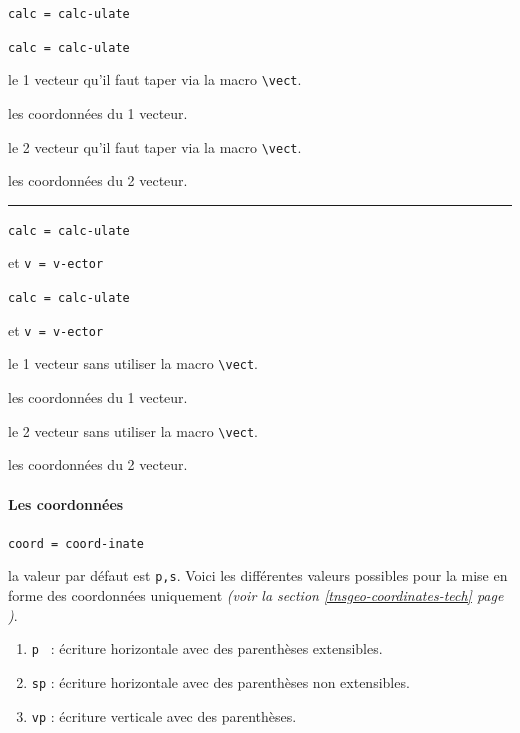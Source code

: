 \documentclass[12pt,a4paper]{book}
\newcommand\env[1]{\texttt{#1}}
\newcommand\macro[1]{\env{\textbackslash{}#1}}
\theoremstyle{definition}
\newcommand\separation{
	\medskip
	\hfill\rule{0.5\textwidth}{0.75pt}\hfill
	\medskip
}
\newcommand\mwhyprefix[2]{%
	\texttt{#1 = #1-#2}%
}
\begin{document}
{{  \hfill \mwhyprefix{calc}{ulate}

  \hfill \mwhyprefix{calc}{ulate}

 le 1\ier{} vecteur qu'il faut taper via la macro \macro{vect}.

 les coordonnées du 1\ier{} vecteur.

 le 2\ieme{} vecteur qu'il faut taper via la macro \macro{vect}.

 les coordonnées du 2\ieme{} vecteur.


\separation


  \hfill \mwhyprefix{calc}{ulate}
                                    et \mwhyprefix{v}{ector}

  \hfill \mwhyprefix{calc}{ulate}
                                    et \mwhyprefix{v}{ector}

 le 1\ier{} vecteur sans utiliser la macro \macro{vect}.

 les coordonnées du 1\ier{} vecteur.

 le 2\ieme{} vecteur sans utiliser la macro \macro{vect}.

 les coordonnées du 2\ieme{} vecteur.



\paragraph{Les coordonnées}



  \hfill \mwhyprefix{coord}{inate}

\IDoption{} la valeur par défaut est \verb+p,s+. 
            Voici les différentes valeurs possibles pour la mise en forme des coordonnées uniquement \emph{(voir la section \ref{tnsgeo-coordinates-tech} page \pageref{tnsgeo-coordinates-tech})}.
\begin{enumerate}
	\item \verb+p + : écriture horizontale avec des parenthèses extensibles.

	\item \verb+sp+ : écriture horizontale avec des parenthèses non extensibles.

	\item \verb+vp+ : écriture verticale avec des parenthèses.


\end{enumerate}}}
\end{document}
